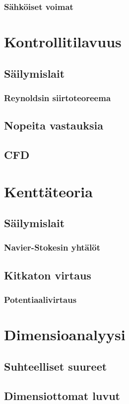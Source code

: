 \documentclass[12pt,a4paper,finnish]{book}
\begin{document}
\subsection{Sähköiset voimat}

\chapter{Kontrollitilavuus}
\section{Säilymislait}
\subsection{Reynoldsin siirtoteoreema}
\section{Nopeita vastauksia}
\section{CFD}

\chapter{Kenttäteoria}
\section{Säilymislait}
\subsection{Navier-Stokesin yhtälöt}
\section{Kitkaton virtaus}
\subsection{Potentiaalivirtaus}

\chapter{Dimensioanalyysi}
\section{Suhteelliset suureet}
\section{Dimensiottomat luvut}
\end{document}
